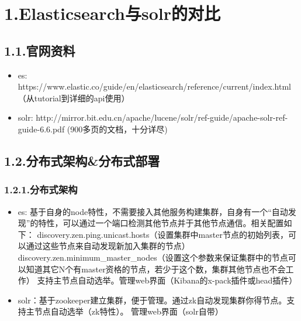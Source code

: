 \documentclass{article}
\begin{document}
\section{1.\hspace*{0.5em}Elasticsearch与solr的对比}\label{sec-elasticsearchsolr}%

\subsection{1.1.\hspace*{0.5em}官网资料}\label{section}%

\begin{itemize}[noitemsep,topsep=\mdcompacttopsep]%

\item{}es: https://www.elastic.co/guide/en/elasticsearch/reference/current/index.html（从tutorial到详细的api使用）%

\item{}solr: http://mirror.bit.edu.cn/apache/lucene/solr/ref-guide/apache-solr-ref-guide-6.6.pdf (900多页的文档，十分详尽)%
\end{itemize}%

\subsection{1.2.\hspace*{0.5em}分布式架构\&分布式部署}\label{section}%

\subsubsection{1.2.1.\hspace*{0.5em}分布式架构}\label{section}%

\begin{itemize}%

\item{}
es: 基于自身的node特性，不需要接入其他服务构建集群，自身有一个“自动发现”的特性，可以通过一个端口检测其他节点并于其他节点通信。相关配置如下：    \mdbr
{}discovery.zen.ping.unicast.hosts（设置集群中master节点的初始列表，可以通过这些节点来自动发现新加入集群的节点）    \mdbr
{}discovery.zen.minimum\_master\_nodes（设置这个参数来保证集群中的节点可以知道其它N个有master资格的节点，若少于这个数，集群其他节点也不会工作）    \mdbr
{}支持主节点自动选举。管理web界面（Kibana的x-pack插件或head插件）%

\item{}
solr：基于zookeeper建立集群，便于管理。通过zk自动发现集群你得节点。支持主节点自动选举（zk特性）。
管理web界面（solr自带）     %
\end{itemize}%
\end{document}
